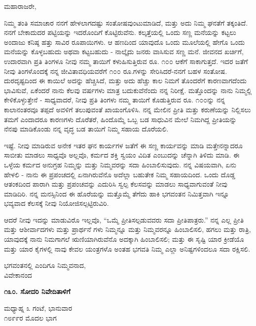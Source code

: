ಮಹಾರಾಜರೇ,

ನಿಮ್ಮ ತಂತಿ ಸಮಾಚಾರ ನನಗೆ ಹೇಳಲಾಗದಷ್ಟು ಸಂತೋಷವುಂಟುಮಾಡಿದೆ, ಮತ್ತು ಅದು ನಿಮ್ಮ ಘನತೆಗೆ ತಕ್ಕಂತಿದೆ. ನನಗೆ ಬೇಕಾದುದರ ಪಟ್ಟಿಯನ್ನು ಇದರೊಂದಿಗೆ ಕೊಟ್ಟಿರುವೆನು. ಕಲ್ಕತ್ತೆಯಲ್ಲಿ ಒಂದು ಸಣ್ಣ ಮನೆಯನ್ನು ಕಟ್ಟಲು ಅಂದಾಜು ಕನಿಷ್ಠ ಹತ್ತು ಸಾವಿರ ರೂಪಾಯಿಗಳು. ಆ ಹಣದಿಂದ ಯಾವುದೊ ಒಂದು ಮೂಲೆಯಲ್ಲಿ ಹೇಗೊ ಒಂದು ಮನೆಯನ್ನು ಕೊಳ್ಳಬಹುದು ಅಥವಾ ಕಟ್ಟಬಹುದು - ನಾಲ್ಕೈದು ಜನರು ವಾಸಿಸುವ ಸಣ್ಣ ಮನೆ. ಜೀವನದ ಖರ್ಚಿಗೆ, ಉದಾರವಾಗಿ ಪ್ರತಿ ತಿಂಗಳೂ ನೀವು ನಮ್ಮ ತಾಯಿಗೆ ಕಳುಹಿಸುತ್ತಿರುವ ರೂ. ೧೦೦ ಆಕೆಗೆ ಸಾಕಾಗುತ್ತದೆ. ಇದರ ಜತೆಗೆ ನೀವು ತಿಂಗಳೊಂದಕ್ಕೆ ನನ್ನ ಜೀವಿತಾವಧಿಯವರೆಗೆ ೧೦೦ ರೂ.ಗಳನ್ನು ಸೇರಿಸಿದರೆ-ನನಗೆ ಬಹಳ ಸಂತೋಷ. ದುರದೃಷ್ಟದಿಂದ ಈ ಕಾಯಿಲೆ ಅದನ್ನು ಹೆಚ್ಚಿಸಿದೆ, ಮತ್ತು ಅದು ಹೆಚ್ಚು ಕಾಲ ನಿಮಗೆ ತೊಂದರೆಗೆ ಕಾರಣವಾಗದೆಂದು ಭಾವಿಸುವೆ, ಏಕೆಂದರೆ ನಾನು ಕೆಲವು ವರ್ಷಗಳು ಮಾತ್ರ ಬದುಕುವೆನೆಂದು ನನ್ನ ನಿರೀಕ್ಷೆ. ಮತ್ತೊಂದನ್ನು ನಾನು ನಿಮ್ಮಲ್ಲಿ ಕೇಳಿಕೊಳ್ಳುತ್ತೇನೆ - ಸಾಧ್ಯವಾದರೆ, ನೀವು ಪ್ರತಿ ತಿಂಗಳು ನಮ್ಮ ತಾಯಿಗೆ ಕೊಡುತ್ತಿರುವ ರೂ. ೧೦೦ನ್ನು ನನ್ನ ಕಾಲಾನಂತರವೂ ತಪ್ಪದೆ ಅವಳಿಗೆ ತಲುಪುವಂತೆ ಖಾಯಂಗೊಳಿಸಿ. ನನ್ನ ಮೇಲಿನ ಪ್ರೀತಿ ಮತ್ತು ಕರುಣೆಯನ್ನು ನಿಲ್ಲಿಸಲು ತಮಗೆ ಎಂದಾದರೂ ಕಾರಣಗಳು ದೊರೆತರೆ, ಹಿಂದೊಮ್ಮೆ ಒಬ್ಬ ಬಡ ಸಾಧುವಿನ ಮೇಲೆ ನಿಮಗಿದ್ದ ಪ್ರೀತಿಯನ್ನು ನೆನಪು ಮಾಡಿಕೊಂಡು ನನ್ನ ವೃದ್ಧ ಬಡ ತಾಯಿಗೆ ನಿಮ್ಮ ಸಹಾಯ ದೊರೆಯಲಿ.

ಇಷ್ಟೆ. ನೀವು ಮಾಡಿರುವ ಅನೇಕ ಇತರ ಘನ ಕಾರ್ಯಗಳ ಜತೆಗೆ ಈ ಸಣ್ಣ ಕಾರ್ಯವನ್ನು ಮಾಡಿ ಮತ್ತೇನನ್ನಾದರೂ ಸಾಬೀತು ಮಾಡಲು ಸಾಧ್ಯವೊ ಅಲ್ಲವೊ, ಕರ್ಮದ ಶಕ್ತಿ ಸ್ವಯಂ ವಿದಿತ ಎಂಬುದನ್ನು ಚೆನ್ನಾಗಿ ತಿಳಿದು ಮಾಡಿ. ಈ ಒಳ್ಳೆಯ ಕರ್ಮದ ಅನುಗ್ರಹ ನಿಮ್ಮನ್ನು ಮತ್ತು ನಿಮ್ಮವರನ್ನು ಸದಾ ಹಿಂಬಾಲಿಸುವುದು. ನನ್ನ ವಿಷಯವಾಗಿ, ಏನು ಹೇಳಲಿ - ನಾನು ಈ ಪ್ರಪಂಚದಲ್ಲಿ ಏನಾಗಿರುವೆನೊ ಅದೆಲ್ಲಾ ಬಹುತೇಕ ನಿಮ್ಮ ಸಹಾಯದಿಂದ. ಒಂದು ದೊಡ್ಡ ಆತಂಕದಿಂದ ಪಾರಾಗಿ ಮತ್ತು ಪ್ರಪಂಚವನ್ನು ಎದುರಿಸಿ ಸ್ವಲ್ಪ ಕೆಲಸವನ್ನು ಮಾಡಲು ಸಾಧ್ಯವಾಗುವಂತೆ ನೀವು ಮಾಡಿದಿರಿ. ನನ್ನ ಮನಸ್ಸಿನಿಂದ ಈ ಹೊರೆಯನ್ನು ಮತ್ತೊಮ್ಮೆ ತೆಗೆದು ಹಾಕಿ ಭಗವಂತನ ನಿಮಿತ್ತವಾಗಿ ಇನ್ನೂ ಭವ್ಯವಾದ ಕೆಲಸಕ್ಕೆ ನೀವು ನಿಯೋಜಿಸಲ್ಪಟ್ಟಿರುವಿರಿ.

ಆದರೆ ನೀವು ಇದನ್ನು ಮಾಡುವಿರೊ ಇಲ್ಲವೊ, “ಒಮ್ಮೆ ಪ್ರೀತಿಸಲ್ಪಡುವವರು ಸದಾ ಪ್ರೀತಿಪಾತ್ರರು.” ನನ್ನ ಎಲ್ಲ ಪ್ರೀತಿ ಮತ್ತು ಆಶೀರ್ವಾದಗಳು ಮತ್ತು ಪ್ರಾರ್ಥನೆ ಗಳು ನಿಮ್ಮನ್ನೂ ಮತ್ತು ನಿಮ್ಮವರನ್ನೂ ಹಿಂಬಾಲಿಸಲಿ, ಹಗಲು ಮತ್ತು ರಾತ್ರಿ, ಯಾವುದಕ್ಕೆ ನಾನು ನಿಮಗಾಗಲೆ ಋಣಿಯಾಗಿರುವೆನೊ ಅದಕ್ಕಾಗಿ ಹಿಂಬಾಲಿಸಲಿ; ಮತ್ತು ಈ ಸೃಷ್ಟಿ ಯಾರ ಕ್ರೀಡೆಯೊ ಮತ್ತು ಯಾರ ಕೈಗಳಲ್ಲಿ ನಾವು ಕೇವಲ ಯಂತ್ರಗಳೊ ಅಂತಹ ಭಗವತಿ ನಿಮ್ಮ ಎಲ್ಲಾ ಅನಿಷ್ಟಗಳಿಂದಲೂ ಸದಾ ರಕ್ಷಿಸಲಿ.

\begin{flushright}
ಭಗವಂತನಲ್ಲಿ ಎಂದಿಗೂ ನಿಮ್ಮವನಾದ,\\ವಿವೇಕಾನಂದ
\end{flushright}

\begin{center}
\textbf{೧೩೦. ಸೋದರಿ ನಿವೇದಿತಾಳಿಗೆ}
\end{center}

\begin{flushright}
ಮಧ್ಯಾಹ್ನ ೩ ಗಂಟೆ, ಭಾನುವಾರ\\೧೮೯೯ರ ಮೊದಲ ಭಾಗ
\end{flushright}

